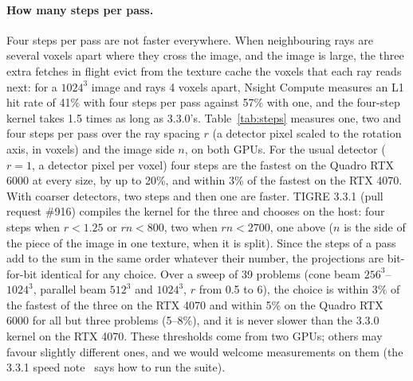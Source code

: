 \documentclass[11pt,a4paper]{article}
\theoremstyle{remark}
\begin{document}
\paragraph{How many steps per pass.} Four steps per pass are not faster everywhere. When neighbouring rays are
several voxels apart where they cross the image, and the image is large, the three extra fetches in flight evict
from the texture cache the voxels that each ray reads next: for a $1024^3$ image and rays 4 voxels apart, Nsight
Compute measures an L1 hit rate of 41\% with four steps per pass against 57\% with one, and the four-step kernel
takes 1.5 times as long as 3.3.0's. Table~\ref{tab:steps} measures one, two and four steps per pass over the ray
spacing $r$ (a detector pixel scaled to the rotation axis, in voxels) and the image side $n$, on both GPUs. For
the usual detector ($r=1$, a detector pixel per voxel) four steps are the fastest on the Quadro RTX 6000 at every
size, by up to 20\%, and within 3\% of the fastest on the RTX 4070. With coarser detectors, two steps and then
one are faster. TIGRE 3.3.1 (pull request \#916) compiles the kernel for the three and chooses on the host: four
steps when $r<1.25$ or $rn<800$, two when $rn<2700$, one above ($n$ is the side of the piece of the image in one
texture, when it is split). Since the steps of a pass add to the sum in the same order whatever their number, the
projections are bit-for-bit identical for any choice. Over a sweep of 39 problems (cone beam $256^3$--$1024^3$,
parallel beam $512^3$ and $1024^3$, $r$ from 0.5 to 6), the choice is within 3\% of the fastest of the three on the
RTX 4070 and within 5\% on the Quadro RTX 6000 for all but three problems (5--8\%), and it is never slower than the
3.3.0 kernel on the RTX 4070. These thresholds come from two GPUs; others may favour slightly different ones,
and we would welcome measurements on them (the 3.3.1 speed note~\cite{tigre331astra} says how to run the suite).
\end{document}
